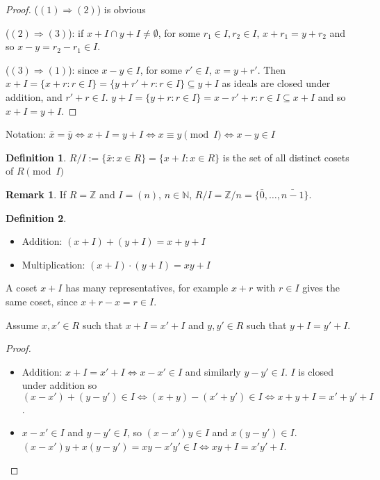\documentclass[12pt,a4paper]{article}
\theoremstyle{definition}
\newtheorem{definition}{Definition}[subsection]
\newtheorem*{remark}{Remark}
\begin{document}
\begin{proof}
	($(1) \Rightarrow (2)$) is obvious

	($(2) \Rightarrow (3)$): if $x + I \cap y + I \ne \emptyset$, for some $r_1 \in I, r_2 \in I$, $x + r_1 = y + r_2$ and so $x - y = r_2 - r_1 \in I$.

	($(3) \Rightarrow (1)$): since $x - y \in I$, for some $r' \in I$, $x = y + r'$. Then $x + I = \{x + r: r \in I\} = \{y + r' + r: r \in I\} \subseteq y + I$ as ideals are closed under addition, and $r' + r \in I$. $y + I = \{y + r: r \in I\} = {x - r' + r: r \in I} \subseteq x + I$ and so $x + I = y + I$.
\end{proof}

Notation: $\bar{x} = \bar{y} \Leftrightarrow x + I = y + I \Leftrightarrow x \equiv y \pmod I \Leftrightarrow x - y \in I$

\begin{definition}
	$R / I := \{\bar{x}: x \in R \} = \{x + I: x \in R\}$ is the set of all distinct cosets of $R \pmod I$ 
\end{definition}

\begin{remark}
	If $R = \mathbb{Z}$ and $I = (n)$, $n \in \mathbb{N}$, $R / I = \mathbb{Z} / n = \{\bar{0}, \dots, \bar{n - 1}\}$.
\end{remark}

\begin{definition}
	\hfill
	\begin{itemize}
		\item Addition: $(x + I) + (y + I) = x + y + I$
		\item Multiplication: $(x + I) \cdot (y + I) = xy + I$
	\end{itemize}
\end{definition}

A coset $x + I$ has many representatives, for example $x + r$ with $r \in I$ gives the same coset, since $x + r - x = r \in I$.

Assume $x, x' \in R$ such that $x + I = x' + I$ and $y, y' \in R$ such that $y + I = y' + I$.

\begin{proof}
	\begin{itemize}
		\item Addition: $x + I = x' + I \Leftrightarrow x - x' \in I$ and similarly $y - y' \in I$. $I$ is closed under addition so $(x - x') + (y - y') \in I \Leftrightarrow (x + y) - (x' + y') \in I \Leftrightarrow x + y + I = x' + y' + I$.
		\item $x - x' \in I$ and $y - y' \in I$, so $(x - x')y \in I$ and $x(y - y') \in I$. $(x - x')y + x(y - y') = xy - x'y' \in I \Leftrightarrow xy + I = x'y' + I$.
	\end{itemize}
\end{proof}
\end{document}
